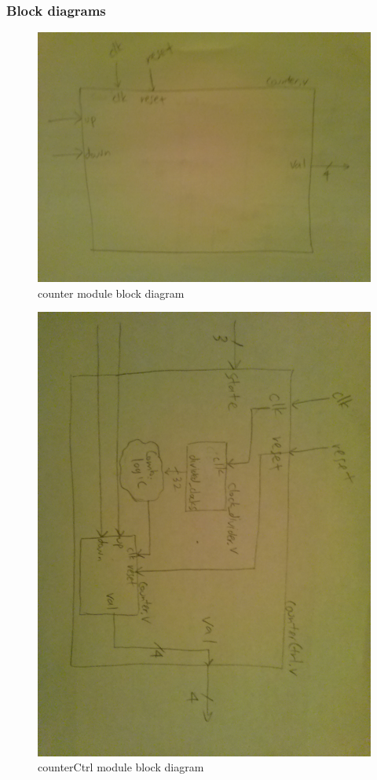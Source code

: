 \documentclass{article}
\begin{document}
    \subsubsection{Block diagrams}
      \begin{figure}[H]
        \centering
        \includegraphics[width=0.75\linewidth]{figures/block_diagrams/counter.jpg}
        \caption{counter module block diagram}
        \label{fig:counter_blockdiagram}
      \end{figure}

      \begin{figure}[H]
        \centering
        \includegraphics[width=0.75\linewidth]{figures/block_diagrams/counterCtrl.jpg}
        \caption{counterCtrl module block diagram}
        \label{fig:counterCtrl_blockdiagram}
      \end{figure}
\end{document}
